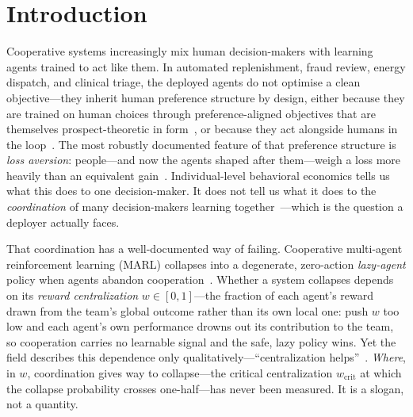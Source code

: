 \documentclass[letterpaper]{article}
\theoremstyle{plain}
\newcommand{\wcrit}{w_{\mathrm{crit}}}
\begin{document}
\section{Introduction}
\label{sec:intro}

Cooperative systems increasingly mix human decision-makers with learning agents
trained to act like them. In automated replenishment, fraud review, energy
dispatch, and clinical triage, the deployed agents do not optimise a clean
objective---they inherit human preference structure by design, either because
they are trained on human choices through preference-aligned objectives that are
themselves prospect-theoretic in form~\citep{ethayarajh2024kto}, or because they
act alongside humans in the loop~\citep{lalmohammed2025}. The most robustly
documented feature of that preference structure is \emph{loss aversion}:
people---and now the agents shaped after them---weigh a loss more heavily than an
equivalent gain~\citep{kahneman1979,tversky1992}. Individual-level behavioral
economics tells us what this does to one decision-maker. It does not tell us what
it does to the \emph{coordination} of many decision-makers learning
together~\citep{leibo2017multi,lowe2017multi}---which is the question a deployer
actually faces.

That coordination has a well-documented way of failing. Cooperative multi-agent
reinforcement learning (MARL) collapses into a degenerate, zero-action
\emph{lazy-agent} policy when agents abandon cooperation~\citep{liu2023lazy,peng2023curo}.
Whether a system collapses depends on its \emph{reward centralization}
$w\in[0,1]$---the fraction of each agent's reward drawn from the team's global
outcome rather than its own local one: push $w$ too low and each agent's own
performance drowns out its contribution to the team, so cooperation carries no
learnable signal and the safe, lazy policy wins. Yet the field describes this
dependence only qualitatively---``centralization helps''~\citep{dmarl2025,liu2023lazy}.
\emph{Where}, in $w$, coordination gives way to collapse---the critical
centralization $\wcrit$ at which the collapse probability crosses one-half---has
never been measured. It is a slogan, not a quantity.
\end{document}
